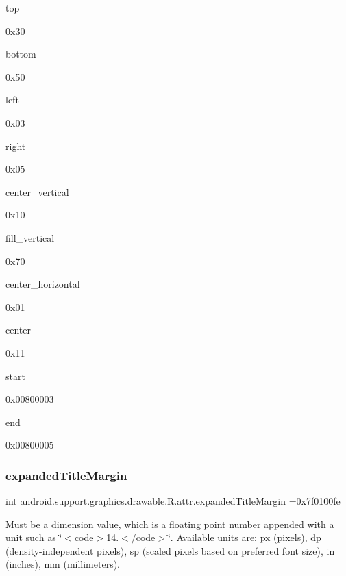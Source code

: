 {\ttfamily top}

0x30

{\ttfamily bottom}

0x50

{\ttfamily left}

0x03

{\ttfamily right}

0x05

{\ttfamily center\+\_\+vertical}

0x10

{\ttfamily fill\+\_\+vertical}

0x70

{\ttfamily center\+\_\+horizontal}

0x01

{\ttfamily center}

0x11

{\ttfamily start}

0x00800003

{\ttfamily end}

0x00800005\mbox{\label{classandroid_1_1support_1_1graphics_1_1drawable_1_1R_1_1attr_af142a32db0dd08eeb8b6882f7d099086}} 
\subsubsection{\texorpdfstring{expanded\+Title\+Margin}{expandedTitleMargin}}
{\footnotesize\ttfamily int android.\+support.\+graphics.\+drawable.\+R.\+attr.\+expanded\+Title\+Margin =0x7f0100fe\hspace{0.3cm}{\ttfamily [static]}}

Must be a dimension value, which is a floating point number appended with a unit such as \char`\"{}$<$code$>$14.\+5sp$<$/code$>$\char`\"{}. Available units are\+: px (pixels), dp (density-\/independent pixels), sp (scaled pixels based on preferred font size), in (inches), mm (millimeters). 

